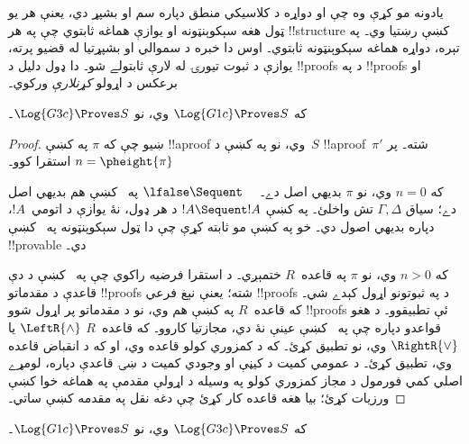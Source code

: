 \documentclass[../../../include/open-logic-section]{subfiles}
\begin{document}


يادونه مو کړې وه چې  او  دواړه د کلاسيکي منطق دپاره سم او بشپړ دي، يعنې هر يو ټول هغه سېکوېنټونه او يوازې هماغه ثابتوي چې په هر !!{structure} کښې رښتيا وي۔ په تېره، دواړه هماغه سېکوېنټونه ثابتوي۔ اوس دا خبره د سموالي او بشپړتيا له قضيو پرته، يوازې د ثبوت تيورۍ له لارې ثابتولے شو۔ دا ډول دليل د  !!{proof}s د  په !!{proof}s او برعکس د اړولو \emph{کړنلارې} ورکوي۔

\begin{prop}
که $\Log{G1c} \Proves S$ وي، نو $\Log{G3c} \Proves S$۔
\end{prop}

\begin{proof}
  ښيو چې که $\pi$ په  کښې !!a{proof} وي، نو په  کښې د~$S$ !!a{proof}~$\pi'$ شته۔ پر $n
  = \pheight{\pi}$ استقرا کوو۔

  که $n = 0$ وي، نو $\pi$ بديهي اصل دے۔ $\lfalse \Sequent
  \quad$ په~ کښې هم بديهي اصل دے؛ سياق $\Gamma,
  \Delta$ تش واخلئ۔ په  کښې $!A \Sequent !A$ د هر ډول، نۀ يوازې د اتومي~$!A$، دپاره بديهي اصول دي۔ خو په  کښې مو ثابته کړې چې دا ټول سېکوېنټونه په~ کښې !!{provable} دي۔

  که $n>0$ وي، نو $\pi$ په قاعده~$R$ ختمېږي۔ د استقرا فرضيه راکوي چې په~ کښې د دې قاعدې د مقدماتو !!{proof}s شته؛ يعنې نېغ فرعي !!{proof}s د  په ثبوتونو اړول کېدے شي۔ که قاعده~$R$ په  کښې هم وي، نو د مقدماتو پر اړول شوو !!{proof}s ئې تطبيقوو۔ د هغو قواعدو دپاره چې په~ کښې عينې نۀ دي، مجازتيا کاروو۔ که قاعده~$R$ $\LeftR{\land}$ يا $\RightR{\lor}$ وي، نو  تطبيق کړئ۔ که د کمزوري کولو قاعده وي،  او که د انقباض قاعده وي،  تطبيق کړئ۔ د عمومي کميت د کيڼې او وجودي کميت د ښۍ قاعدې دپاره، لومړے اصلي کمي فورمول د مجاز کمزوري کولو په وسيله د اړولې مقدمې په هماغه خوا کښې ورزيات کړئ؛ بيا هغه قاعده کار کړئ چې دغه نقل په مقدمه کښې ساتي۔
\end{proof}

\begin{prop}
که $\Log{G3c} \Proves S$ وي، نو $\Log{G1c} \Proves S$۔
\end{prop}
\end{document}
